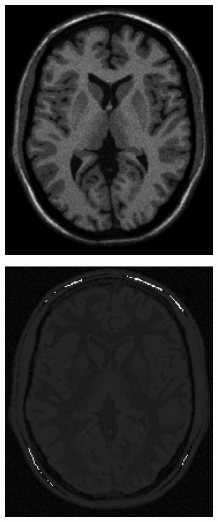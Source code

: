 \documentclass[11pt,twocolumn,twoside]{opticajnl}
\begin{document}
\begin{figure}[h]
\begin{subfigure}[h]{0.24\linewidth}
            \includegraphics[width=\textwidth]{Figuras/ImageA_exp_gamma=1.75.png}
        \end{subfigure}
        \begin{subfigure}[h]{0.24\linewidth}
            \centering
            \includegraphics[width=\textwidth]{Figuras/sustraction_exp_gamma=1.75.png}

\end{subfigure}
\end{figure}
\end{document}
